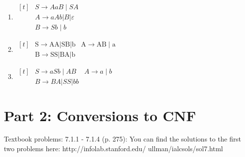 \documentclass[12pt]{scrbook}
\begin{document}
\begin{enumerate}
  \item $
    \begin{aligned}[t]
        & S \rightarrow A a B \mid S A \\
        & A \rightarrow a A b|B| \varepsilon \\
        & B \rightarrow S b \mid b
    \end{aligned}
     $

  \begin{figure}[H]
  \end{figure}

   \item $
     \begin{aligned}[t]
       & \mathrm{S} \rightarrow \mathrm{AA}|\mathrm{SB}| \mathrm{b}
       & \mathrm{A} \rightarrow \mathrm{AB} \mid \mathrm{a} \\
       & \mathrm{B} \rightarrow \mathrm{SS}|\mathrm{BA}| \mathrm{b}
     \end{aligned}
     $
   \item $
     \begin{aligned}[t]
        & S \rightarrow a S b \mid A B
        & A \rightarrow a \mid b \\
        & B \rightarrow B A|S S| b b
     \end{aligned}
     $
\end{enumerate}

\newpage

\section*{Part 2: Conversions to CNF}
Textbook problems: 7.1.1 - 7.1.4 (p. 275): You can find the solutions to the first two problems here: http://infolab.stanford.edu/ ullman/ialcsols/sol7.html
\end{document}
